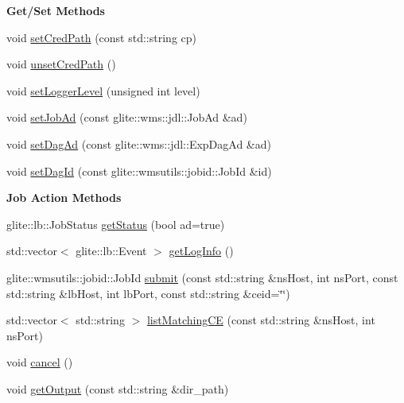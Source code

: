 \begin{Indent}{\bf Get/Set Methods}\par
\begin{CompactItemize}
\item 
void \hyperlink{classglite_1_1wmsui_1_1api_1_1Request_z11_0}{set\-Cred\-Path} (const std::string cp)
\item 
void \hyperlink{classglite_1_1wmsui_1_1api_1_1Request_z11_1}{unset\-Cred\-Path} ()
\item 
void \hyperlink{classglite_1_1wmsui_1_1api_1_1Request_z11_2}{set\-Logger\-Level} (unsigned int level)
\item 
void \hyperlink{classglite_1_1wmsui_1_1api_1_1Request_z11_3}{set\-Job\-Ad} (const glite::wms::jdl::Job\-Ad \&ad)
\item 
void \hyperlink{classglite_1_1wmsui_1_1api_1_1Request_z11_4}{set\-Dag\-Ad} (const glite::wms::jdl::Exp\-Dag\-Ad \&ad)
\item 
void \hyperlink{classglite_1_1wmsui_1_1api_1_1Request_z11_5}{set\-Dag\-Id} (const glite::wmsutils::jobid::Job\-Id \&id)
\end{CompactItemize}
\end{Indent}
\begin{Indent}{\bf Job Action Methods}\par
\begin{CompactItemize}
\item 
glite::lb::Job\-Status \hyperlink{classglite_1_1wmsui_1_1api_1_1Request_z13_0}{get\-Status} (bool ad=true)
\item 
std::vector$<$ glite::lb::Event $>$ \hyperlink{classglite_1_1wmsui_1_1api_1_1Request_z13_1}{get\-Log\-Info} ()
\item 
glite::wmsutils::jobid::Job\-Id \hyperlink{classglite_1_1wmsui_1_1api_1_1Request_z13_2}{submit} (const std::string \&ns\-Host, int ns\-Port, const std::string \&lb\-Host, int lb\-Port, const std::string \&ceid=\char`\"{}\char`\"{})
\item 
std::vector$<$ std::string $>$ \hyperlink{classglite_1_1wmsui_1_1api_1_1Request_z13_3}{list\-Matching\-CE} (const std::string \&ns\-Host, int ns\-Port)
\item 
void \hyperlink{classglite_1_1wmsui_1_1api_1_1Request_z13_4}{cancel} ()
\item 
void \hyperlink{classglite_1_1wmsui_1_1api_1_1Request_z13_5}{get\-Output} (const std::string \&dir\_\-path)
\end{CompactItemize}
\end{Indent}


